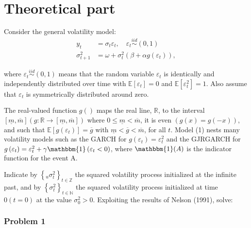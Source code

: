 \documentclass{EconHomework}
\begin{document}
\part*{Theoretical part}
\setcounter{section}{0}


Consider the general volatility model:
\begin{equation}
    \begin{aligned}
        y_{t} &=\sigma_{t} \varepsilon_{t}, \quad \varepsilon_{t} \stackrel{i i d}{\sim}(0,1) \\
        \sigma_{t+1}^{2} &=\omega+\sigma_{t}^{2}\left(\beta+\alpha g\left(\varepsilon_{t}\right)\right),
    \end{aligned}
\label{GVM}
\end{equation}


where $\varepsilon_{t} \stackrel{i i d}{\sim}(0,1)$ means that the random variable $\varepsilon_{t}$ is identically and independently distributed over time with $\mathbb{E}\left[\varepsilon_{t}\right]=0$ and $\mathbb{E}\left[\varepsilon_{t}^{2}\right]=1$. Also assume that $\varepsilon_{t}$ is symmetrically distributed around zero.

\bigskip

The real-valued function $g()$ maps the real line, $\mathbb{R}$, to the interval $[\underline{m}, \overline{m}](g: \mathbb{R} \rightarrow[\underline{m}, \overline{m}])$ where $0 \leq \underline{m}<\overline{m}$, it is even $(g(x)=g(-x))$, and such that $\mathbb{E}\left[g\left(\varepsilon_{t}\right)\right]=\overline{g}$ with $\underline{m}<\overline{g}<\overline{m}$, for all $t$. Model (1) nests many volatility models such as the GARCH for $g\left(\varepsilon_{t}\right)=\varepsilon_{t}^{2}$ and the GJRGARCH for $g\left(\varepsilon_{t}\right)=\varepsilon_{t}^{2}+\gamma \mathbbm{1}\left(\varepsilon_{t}<0\right)$, where $\mathbbm{1}(A)$ is the indicator function for the event A.

\bigskip

Indicate by $\left\{{ }_{u} \sigma_{t}^{2}\right\}_{t \in \mathbb{Z}}$ the squared volatility process initialized at the infinite past, and by $\left\{\sigma_{t}^{2}\right\}_{t \in \mathbb{N}}$ the squared volatility process initialized at time $0(t=0)$ at the value $\sigma_{0}^{2}>0$. Exploiting the results of Nelson (1991), solve:



\section{Problem 1}
\label{T_P1}
\end{document}
